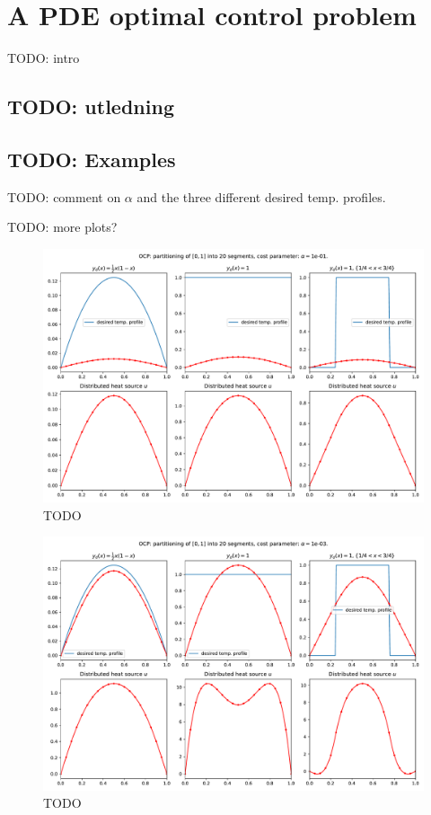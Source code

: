 \section{A PDE optimal control problem}

TODO: intro

\subsection{TODO: utledning}


\subsection{TODO: Examples}


TODO: comment on \( \alpha \) and the three different desired temp. profiles.

TODO: more plots?


\begin{figure}[!h]
  \centering
  \includegraphics[width=\textwidth]{Images/plots/task2_fig_0.pdf}
  \caption{TODO}
  \label{fig:0}
\end{figure}

\begin{figure}[!h]
  \centering
  \includegraphics[width=\textwidth]{Images/plots/task2_fig_1.pdf}
  \caption{TODO}
  \label{fig:1}
\end{figure}

